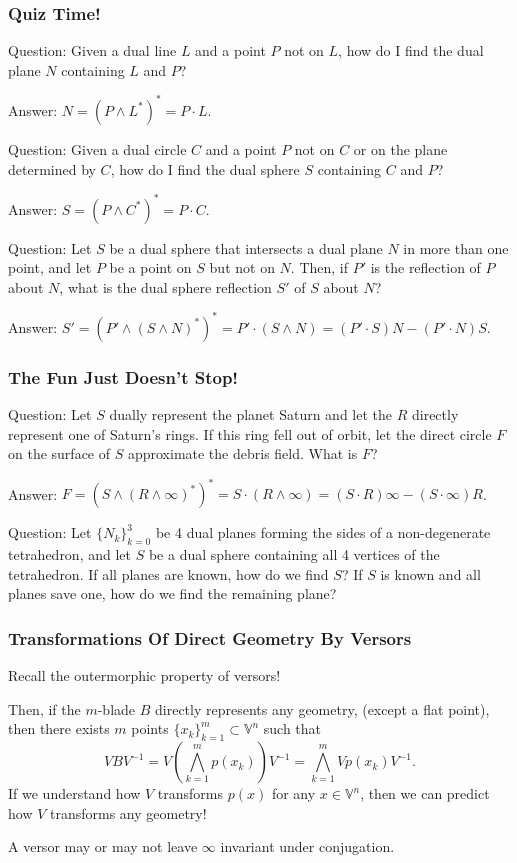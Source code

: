 \documentclass{beamer}
\newcommand{\V}{\mathbb{V}}
\newcommand{\nvai}{\infty}
\begin{document}
\begin{frame}
\frametitle{Quiz Time!}
\alert{Question}: Given a \alert{dual} line $L$ and a point $P$ not on $L$,
how do I find the \alert{dual} plane $N$ containing $L$ and $P$?

\alert{Answer}: $N = (P\wedge L^*)^* = P\cdot L$.

\alert{Question}: Given a \alert{dual} circle $C$ and a point $P$ not on $C$ or on
the plane determined by $C$, how do I find the \alert{dual} sphere $S$ containing $C$ and $P$?

\alert{Answer}: $S = (P\wedge C^*)^* = P\cdot C$.

\alert{Question}: Let $S$ be a \alert{dual} sphere that intersects a \alert{dual} plane $N$ in more than one point, and let $P$ be a point on $S$ but not on $N$.  Then, if $P'$ is the reflection of $P$ about $N$, what is the \alert{dual} sphere reflection $S'$ of $S$ about $N$?

\alert{Answer}: $S' = (P'\wedge(S\wedge N)^*)^* = P'\cdot(S\wedge N) = (P'\cdot S)N - (P'\cdot N)S$.
\end{frame}

\begin{frame}
\frametitle{The Fun Just Doesn't Stop!}
\alert{Question}: Let $S$ \alert{dually} represent the planet Saturn and let the $R$ \alert{directly} represent
one of Saturn's rings.  If this ring fell out of orbit, let the \alert{direct} circle $F$ on the surface of $S$ approximate
the debris field.  What is $F$?

\alert{Answer}: $F = (S\wedge (R\wedge\nvai)^*)^* = S\cdot (R\wedge\nvai) = (S\cdot R)\nvai - (S\cdot\nvai)R$.

\alert{Question}: Let $\{N_k\}_{k=0}^3$ be 4 \alert{dual} planes forming the sides of
a non-degenerate tetrahedron, and let $S$ be a \alert{dual} sphere containing all
4 vertices of the tetrahedron.  If all planes are known, how do we find $S$?
If $S$ is known and all planes save one, how do we find the remaining plane?

%

\end{frame}

\begin{frame}
\frametitle{Transformations Of \alert{Direct} Geometry By Versors}
Recall the \alert{outermorphic} property of versors!

Then, if the $m$-blade $B$ \alert{directly} represents
any geometry, (\alert{except a flat point}), then there exists $m$
points $\{x_k\}_{k=1}^m\subset\V^n$ such that
\begin{equation*}
VBV^{-1} = V\left(\bigwedge_{k=1}^m p(x_k)\right)V^{-1} = \bigwedge_{k=1}^m Vp(x_k)V^{-1}.
\end{equation*}
If we understand how $V$ transforms $p(x)$ for any $x\in\V^n$, then we can
predict how $V$ transforms any geometry!

A versor may or may not leave $\nvai$ invariant under conjugation.
\end{frame}
\end{document}
